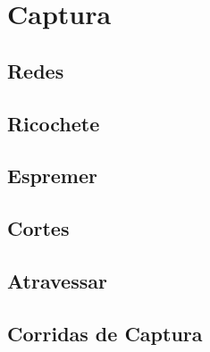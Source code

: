 \part{Captura}











% 
% 
% 
% 
% 
% 

\chapter{Redes}
\emptypage
\emptypage
\emptypage

\chapter{Ricochete}
\emptypage
\emptypage
\emptypage

\chapter{Espremer}
\emptypage
\emptypage
\emptypage

\chapter{Cortes}
\emptypage
\emptypage
\emptypage

\chapter{Atravessar}
\emptypage
\emptypage
\emptypage

\chapter{Corridas de Captura}
\emptypage
\emptypage
\emptypage